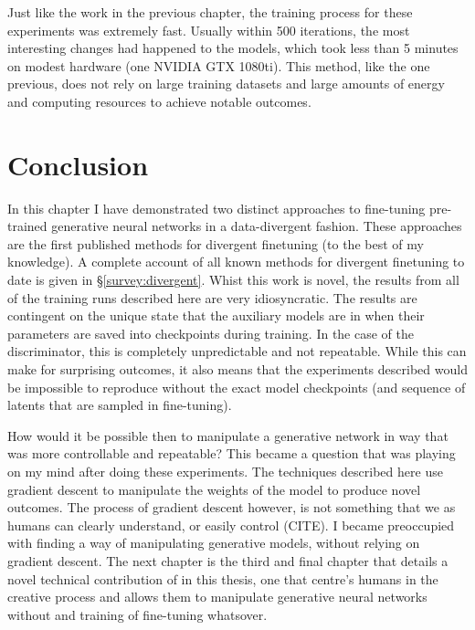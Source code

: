 Just like the work in the previous chapter, the training process for these experiments was extremely fast. 
Usually within 500 iterations, the most interesting changes had happened to the models, which took less than 5 minutes on modest hardware (one NVIDIA GTX 1080ti). 
This method, like the one previous, does not rely on large training datasets and large amounts of energy and computing resources to achieve notable outcomes. 


\section{Conclusion}

In this chapter I have demonstrated two distinct approaches to fine-tuning pre-trained generative neural networks in a data-divergent fashion.
These approaches are the first published methods for divergent finetuning (to the best of my knowledge).
A complete account of all known methods for divergent finetuning to date is given in \S \ref{survey:divergent}.
Whist this work is novel, the results from all of the training runs described here are very idiosyncratic. 
The results are contingent on the unique state that the auxiliary models are in when their parameters are saved into checkpoints during training. 
In the case of the discriminator, this is completely unpredictable and not repeatable. 
While this can make for surprising outcomes, it also means that the experiments described would be impossible to reproduce without the exact model checkpoints (and sequence of latents that are sampled in fine-tuning).

How would it be possible then to manipulate a generative network in way that was more controllable and repeatable?
This became a question that was playing on my mind after doing these experiments. 
The techniques described here use gradient descent to manipulate the weights of the model to produce novel outcomes. 
The process of gradient descent however, is not something that we as humans can clearly understand, or easily control (CITE).
I became preoccupied with finding a way of manipulating generative models, without relying on gradient descent. 
The next chapter is the third and final chapter that details a novel technical contribution of in this thesis, one that centre's humans in the creative process and allows them to manipulate generative neural networks without and training of fine-tuning whatsover.
